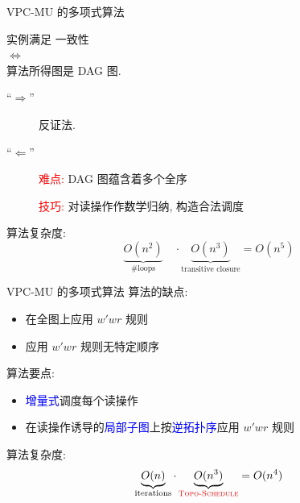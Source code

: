 \begin{frame}{VPC-MU 的多项式算法 \rwclosure{}}
  \begin{ctheorem}
	\begin{center}
	   实例满足 \PRAM{} 一致性\\
		$\iff$\\
	  \rwclosure{} 算法所得图是 DAG 图.
	\end{center}
  \end{ctheorem}

  \pause
  \vspace{0.20cm}

  \begin{cproof}
	\begin{description}
	  \item[``$\Longrightarrow$''] 反证法.
	  \item[``$\Longleftarrow$''] 
		\textcolor{red}{难点:} DAG 图蕴含着多个全序

		\textcolor{red}{技巧:} 对读操作作数学归纳, 构造合法调度
	\end{description}
  \end{cproof}

  \pause
  \vspace{0.30cm}

  \rwclosure{} 算法复杂度: 
  \[
    \underbrace{O(n^2)}_{\textrm{\#loops}} \quad\cdot
	\underbrace{O(n^3)}_{\textrm{transitive closure}}  = O(n^5)
  \]
\end{frame}
\begin{frame}{VPC-MU 的多项式算法 \readcentric{}}
  \rwclosure{} 算法的缺点:
  \begin{itemize}
	\item 在全图上应用 $w'wr$ 规则
	\item 应用 $w'wr$ 规则无特定顺序
  \end{itemize}

  \pause
  \vspace{0.50cm}

  \readcentric{} 算法要点:
  \begin{itemize}
	\item \textcolor{blue}{增量式}调度每个读操作
	\item 在读操作诱导的\textcolor{blue}{局部子图}上按\textcolor{blue}{逆拓扑序}应用 $w'wr$ 规则
  \end{itemize}

  \pause
  \vspace{0.60cm}
  \rwclosure{} 算法复杂度: 
  \[
    \underbrace{O(n)}_{\textrm{iterations}} \cdot
	\underbrace{O(n^3)}_{\textcolor{red}{\textsc{Topo-Schedule}}} = O(n^4)
  \]
\end{frame}
